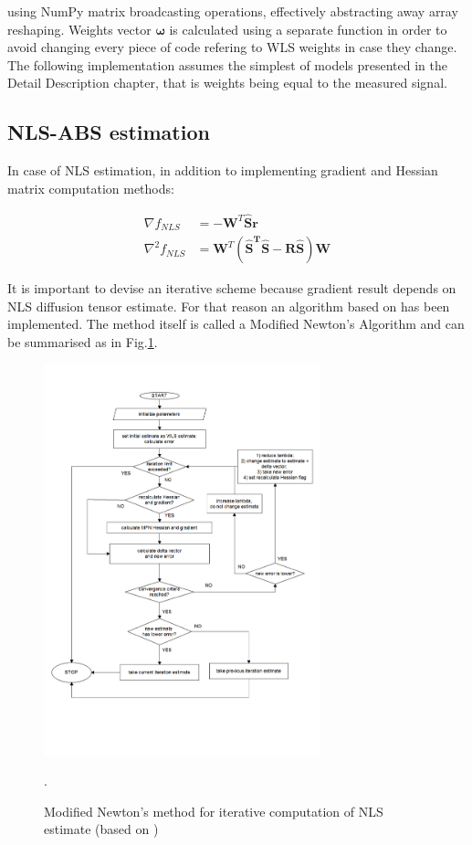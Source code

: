 using NumPy matrix broadcasting operations, effectively abstracting away array reshaping. Weights vector $\boldsymbol{\omega}$ is calculated using a separate function in order to avoid changing every piece of code refering to WLS weights in case they change. The following implementation assumes the simplest of models presented in the Detail Description chapter, that is weights being equal to the measured signal.

\subsection{NLS-ABS estimation}

In case of NLS estimation, in addition to implementing gradient and Hessian matrix computation methods:

\begin{equation}
\begin{aligned}
\nabla{f_{NLS}}&=-\boldsymbol{W}^T\boldsymbol{\hat{S}}\boldsymbol{r} \\
\nabla^2{f_{NLS}}&=\boldsymbol{W}^T\left(\boldsymbol{\hat{S}^T\hat{S}-\boldsymbol{R\hat{S}}}\right)\boldsymbol{W}
\end{aligned}
\label{Eq:m6_impl_2}
\end{equation}

It is important to devise an iterative scheme because gradient result depends on NLS diffusion tensor estimate. For that reason an algorithm based on \cite{m6_koay2006a} has been implemented. The method itself is called a Modified Newton's Algorithm and can be summarised as in Fig.\ref{fig:m6_pic_1}.

\begin{figure}[H]
	\includegraphics[width=8cm]{figures/Module_06/mfn_simple}
	\centering
	\caption{Modified Newton's method for iterative computation of NLS estimate \vbox{(based on \cite{m6_koay2006a})}}.
	\label{fig:m6_pic_1}
\end{figure}

